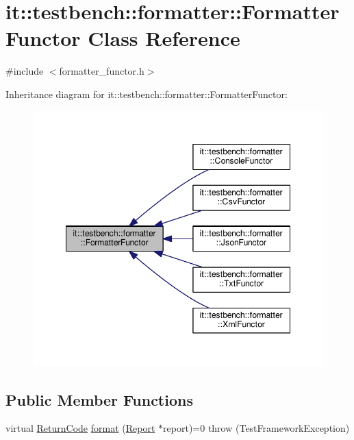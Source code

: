 \hypertarget{classit_1_1testbench_1_1formatter_1_1FormatterFunctor}{\section{it\-:\-:testbench\-:\-:formatter\-:\-:Formatter\-Functor Class Reference}
\label{d3/dc1/classit_1_1testbench_1_1formatter_1_1FormatterFunctor}
}


{\ttfamily \#include $<$formatter\-\_\-functor.\-h$>$}



Inheritance diagram for it\-:\-:testbench\-:\-:formatter\-:\-:Formatter\-Functor\-:
\nopagebreak
\begin{figure}[H]
\begin{center}
\leavevmode
\includegraphics[width=348pt]{de/d2d/classit_1_1testbench_1_1formatter_1_1FormatterFunctor__inherit__graph}
\end{center}
\end{figure}
\subsection*{Public Member Functions}
\begin{DoxyCompactItemize}
\item 
virtual \hyperlink{structit_1_1testbench_1_1data_1_1ReturnCode}{Return\-Code} \hyperlink{classit_1_1testbench_1_1formatter_1_1FormatterFunctor_a37bda4de0839c23a0b406d898cf435c3}{format} (\hyperlink{classit_1_1testbench_1_1data_1_1Report}{Report} $\ast$report)=0  throw (\-Test\-Framework\-Exception)
\end{DoxyCompactItemize}


